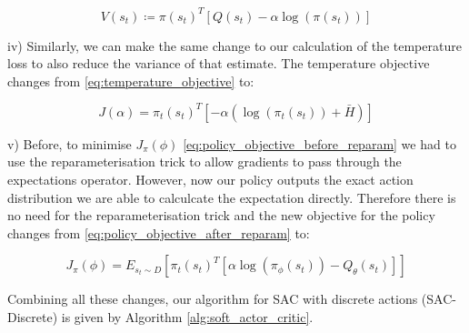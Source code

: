 \documentclass{article}
\begin{document}
\begin{equation}
 V(s_t) \coloneqq  \pi(s_t)^T[Q(s_t) - \alpha \log(\pi(s_t))]
\label{eq:new_soft_state_value}
\end{equation}

iv) Similarly, we can make the same change to our calculation of the temperature loss to also reduce the variance of that estimate. The temperature objective changes from \eqref{eq:temperature_objective} to:

\begin{equation}
J(\alpha) =  \pi_t(s_t)^T[-\alpha (\log (\pi_t(s_t)) + \bar{H})]
\label{eq:temperature_objective_new}
\end{equation}

v) Before, to minimise $J_{\pi}(\phi)$ \eqref{eq:policy_objective_before_reparam} we had to use the reparameterisation trick to allow gradients to pass through the expectations operator. However, now our policy outputs the exact action distribution we are able to calculcate the expectation directly. Therefore there is no need for the reparameterisation trick and the new objective for the policy changes from \eqref{eq:policy_objective_after_reparam} to:

\begin{equation}
J_{\pi}(\phi) = E_{s_t \sim D}[\pi_t(s_t)^T[\alpha \log(\pi_{\phi}(s_t)) - Q_{\theta}(s_t)]]
\label{eq:policy_objective_new}
\end{equation}

Combining all these changes, our algorithm for SAC with discrete actions (SAC-Discrete) is given by Algorithm \ref{alg:soft_actor_critic}.
\end{document}

